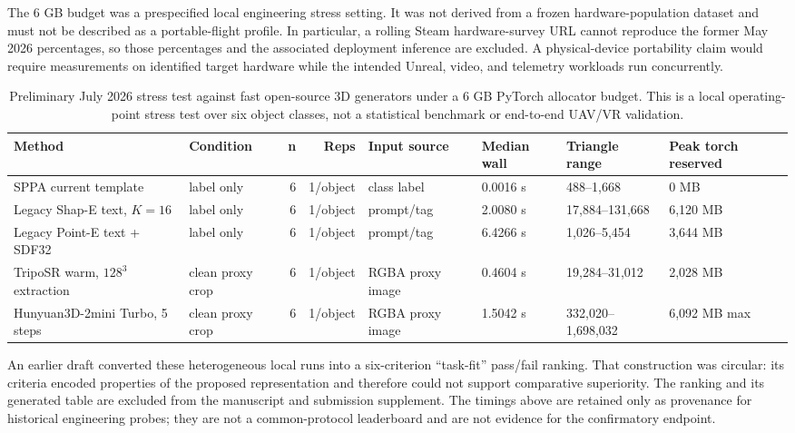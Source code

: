 ﻿\documentclass[11pt,a4paper]{article}
\begin{document}
The 6 GB budget was a prespecified local engineering stress setting. It was not
derived from a frozen hardware-population dataset and must not be described as
a portable-flight profile. In particular, a rolling Steam hardware-survey URL
cannot reproduce the former May 2026 percentages, so those percentages and the
associated deployment inference are excluded. A physical-device portability
claim would require measurements on identified target hardware while the
intended Unreal, video, and telemetry workloads run concurrently.

\begin{table}[h]
\centering
\scriptsize
\setlength{\tabcolsep}{2pt}
\caption{Preliminary July 2026 stress test against fast open-source 3D
generators under a 6 GB PyTorch allocator budget. This is a local operating-point
stress test over six object classes, not a statistical benchmark or end-to-end
UAV/VR validation.}
\label{tab:sota-stress-test}
\begin{tabular}{@{}p{2.4cm}p{1.6cm}r r p{1.9cm}p{1.6cm}p{2.0cm}p{1.7cm}@{}}
\toprule
Method & Condition & n & Reps & Input source & Median wall & Triangle range & Peak torch reserved \\
\midrule
SPPA current template & label only & 6 & 1/object & class label & 0.0016 s & 488--1,668 & 0 MB \\
Legacy Shap-E text, \(K=16\) & label only & 6 & 1/object & prompt/tag & 2.0080 s & 17,884--131,668 & 6,120 MB \\
Legacy Point-E text + SDF32 & label only & 6 & 1/object & prompt/tag & 6.4266 s & 1,026--5,454 & 3,644 MB \\
TripoSR warm, \(128^3\) extraction & clean proxy crop & 6 & 1/object & RGBA proxy image & 0.4604 s & 19,284--31,012 & 2,028 MB \\
Hunyuan3D-2mini Turbo, 5 steps & clean proxy crop & 6 & 1/object & RGBA proxy image & 1.5042 s & 332,020--1,698,032 & 6,092 MB max \\
\bottomrule
\end{tabular}
\end{table}

An earlier draft converted these heterogeneous local runs into a six-criterion
``task-fit'' pass/fail ranking. That construction was circular: its criteria
encoded properties of the proposed representation and therefore could not
support comparative superiority. The ranking and its generated table are
excluded from the manuscript and submission supplement. The timings above are
retained only as provenance for historical engineering probes; they are not a
common-protocol leaderboard and are not evidence for the confirmatory endpoint.
\end{document}
